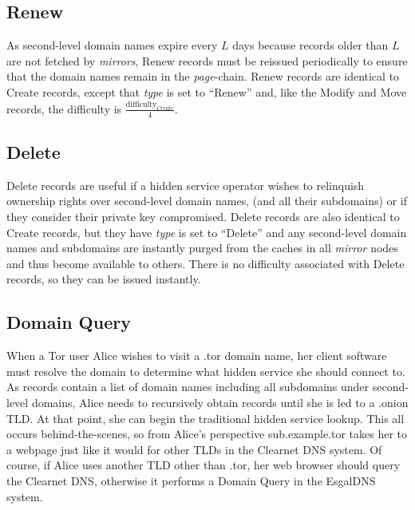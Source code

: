 
\subsection{Renew}

As second-level domain names expire every $ L $ days because records older than $ L $ are not fetched by \emph{mirrors}, Renew records must be reissued periodically to ensure that the domain names remain in the \emph{page}-chain. Renew records are identical to Create records, except that \emph{type} is set to ``Renew'' and, like the Modify and Move records, the difficulty is $ \frac{\textrm{difficulty}_{Create}}{4} $.


\subsection{Delete}

Delete records are useful if a hidden service operator wishes to relinquish ownership rights over second-level domain names, (and all their subdomains) or if they consider their private key compromised. Delete records are also identical to Create records, but they have \emph{type} is set to ``Delete'' and any second-level domain names and subdomains are instantly purged from the caches in all \emph{mirror} nodes and thus become available to others. There is no difficulty associated with Delete records, so they can be issued instantly.


\subsection{Domain Query}
\label{sec:DomainQuery}

When a Tor user Alice wishes to visit a .tor domain name, her client software must resolve the domain to determine what hidden service she should connect to. As records contain a list of domain names including all subdomains under second-level domains, Alice needs to recursively obtain records until she is led to a .onion TLD. At that point, she can begin the traditional hidden service lookup. This all occurs behind-the-scenes, so from Alice's perspective sub.example.tor takes her to a webpage just like it would for other TLDs in the Clearnet DNS system. Of course, if Alice uses another TLD other than .tor, her web browser should query the Clearnet DNS, otherwise it performs a Domain Query in the EsgalDNS system.


